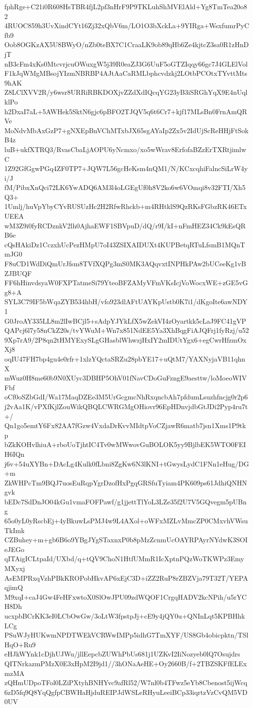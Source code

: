 fphRge+C21i0R608HsTBR4fjL2pf3nHrF9P9TKLuhShMVElAld+Yg8TmTea20o82
4RUOC859h3UvXindCYt16Zj32xQbV6m/LO1O3bXckLa+9YIRga+WsxfumrPyCfb9
Oob8OGKzAX5U8BWyO/nZb0teBX7C1CraaLK9ob89qHb6Ze4kjtcZ3sa0R1zHnDjT
nB3cFm4xKs0MtcvrjcuOWuxgW5j39R0eaZJ3G6UuF5oGTZIqqy66gc7J4GLElVol
F1kJqWMgMBsojYIzmNBRBP4AJtAaCaRMLbphcvdzkj2LOtbPCOtxTYvttMts9hAK
Z8LClXVV2R/y6wsr8URRiRBKDOXjvZZdXdIQcqYG23yB3iSRGhYqX9E4nUqlklPo
h2DxaI7aL+5AWHek5SktN6gjc6pBFO2TJQV5q6t6Cr7+kjf17MLsBn0FrnAmQRVe
MoNdvMbAxGzP7+gNXEpBnVChMTxbJX65sgAYaIp2Zx5v2IdUjScReHHjFtSokB4z
luB+ukfXTRQ3/RvasCbaLjAOPU6yNcmxo/xo5wWrav8ErfofaBZzErTXRtjimlwC
1Z92GfGgwPGq4ZF0TP7+JQW7L56gcHeKsm4nQM1/N/KCxcqhiFalncSiLrW4yi/J
fM/PibxXnQci72LK6YwADQ6AM3l4oLGEgUf0h8V2ko6w6VOmqi8v32FTI/Xh5Q3+
1Umlj/huVpYbyCYvRUSUzHc2H2RfwRhckb+m4RHtklS9QzRKsFGbzRK46ETxUEEA
wM3Z9i0fyRCDznkV2lh0AjhaEWF1SBVpuD/dQ/r9I/kI+nFmHEZ34Ck9kEsQRB6e
cQsHAkiDz1CczxhUcPezHMpU7oI43ZSIXAIDUXt4KUPBetqRTuLfsmB1MQnTmJG0
F8uCD1WdDiQmUrJfsm8TVfXQPg3mS0MK3AQqvxtINPHkPAw2bUCeeKg1vBZJBUQF
FF6hHinvdsyaW0FXPTatmeSi79YteoBFZAMyVFmVKsIcjVoWocxWE+zGE5vGg8+A
SYL3C79IF5bWqaZYB534hbH/vfo923dlAFtUAYKpUstb0K7i1/dKgoIte6awNDY1
G0JroAY335LL8m2lIwBCjl5+sAdpYJYkLfX5wZekVI4zOyartkk5cLaJ9FC41gVP
QAPcj6l7y58nCkZ20s/tvYWuM+Wn7x851NdEE5Ya3XhBqgFiAJQFrj1fyRzj/u52
9Xp7rA9/2P8qn2tHMYExySLgGHasblWhwzjHxIY2mIDUtYgx6+egCwrHfzmOxXj8
oqIU47FH7bp4gu4e0rfr+1xlzYQctaSRZu28pbYE17+uQtM7/YAXNyjaVB11qhnX
mWuz0H8me60b9N0XUyc3DBHP5OhV01fNavCDoGuFzngE9aesttw/loMoeoWIVFbf
oCf0oSZbGdI/Wa17MaqDZEe3M5UrGcgmcNhRxqncbAh7pfdumLsuzhfncjg0r2p6
j2vAa1K/vPXfKjlZouWikQBQLCWRGMgOHiovr96EpHDnvjdbGtJDi2Pyp4ru7t+/
Qn1go5emtY6Fx82AA7fGzw4VxdaDrKvvMIdtpVoCZjawR6matb7jsn1Xms1P9tkp
bZkKOHvlhiuA+rboUoTjhtIC4Tv0wMWwovGuBOLOK5yy9BjlbEK5WTO0FEIH6IQn
j6v+54uXYBn+DAcLg4Kulk0fLbni8ZgKw6N3lKNI+tGwysLydC1FNn1eHug/DG+m
ZkWHPcTm9BQJ7uosEuRqpYgrDzofHxPgqGRSfuTyiam4PK609ps61JdhiQNHNgvk
bEDc7SdDnJO04kGu1vmaFOFPawf/g1jjettTlYoL3LZe35f2U7V5GQvegm5pUBng
65o0yL0yRscbEj+4yBkuwLsPMJ4w9L4AXol+oWFxMZLvMmcZP0CMxvhVWsuTkImk
CZBuhey+m+gb6B6o9YBgJYgSTaxnxP0b8pMzZcnmUcOAYRPAyrNYdwK3SOIeJEGo
qITAigICLtpaId/UXbd/q+tQV9ChoN1HtfUMmR1IcXptnPQzWoTKWPz3EmyMXyxj
AsEMPRxqVzhPBkKROPobHkvAP6xEjC3D+iZZ2RuP8rZBZVja79T32T/YEPAqjimQ
M9xqI+caJ4Gw4FeHFxwtoX0SlOwJPU09zdWQOF1CrgqHADV2kcNPih/u5rYCH8Dh
ucxpbBCrKK3eI0LCbOwGw/3oLtW3fpstpJj+cE9y4jQY0u+QNInLqt5KPBHhkLCg
PSuWJyHUKwmNPDTWEkVCRWwIMPp5idhG7TmXYF/US8Gb4obicpktn/TSlHqO+Ru9
eHJkWYnk1cDjhUJWu/jllEepcbZUWhPbUs681j1UZKvI2IiNozyeb0lQ7Osujdrs
QITNrkazmPMzX0E3xHpM2I9jd1//3hONaAeHE+Oy2660B/f+2TBZSKFfELExmzMA
zQHmUDpoTFol0LZiPXtyhBNHYvc9afRl52/W7nl0b4TFwz5eYb8Cbenost5ijWcq
6zD5fq9Q8YqQgfpCBWHaHjduREIPJdWSLeRHyuLeeiBCp33iqrtzVzCvQM5VD0UV

